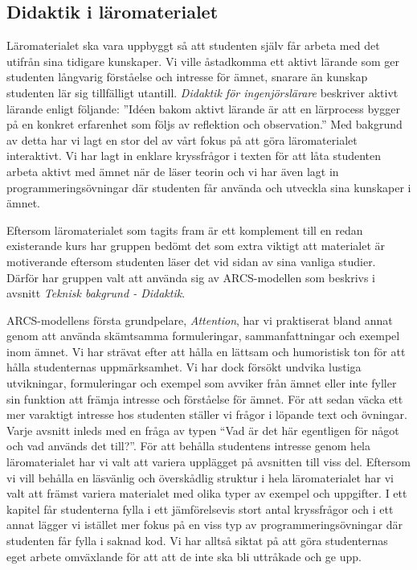 \documentclass[12pt,a4paper,twoside,openright]{article}
\begin{document}
\subsection{Didaktik i läromaterialet}
\label{sec:matDidaktik}
Läromaterialet ska vara uppbyggt så att studenten själv får arbeta med
det utifrån sina tidigare kunskaper. Vi ville åstadkomma ett aktivt
lärande som ger studenten långvarig förståelse och intresse för ämnet,
snarare än kunskap studenten lär sig tillfälligt
utantill. \textit{Didaktik för ingenjörslärare}\cite{didaktik_for_ingenjorslarare} beskriver aktivt
lärande enligt följande: ”Idéen bakom aktivt lärande är att en
lärprocess bygger på en konkret erfarenhet som följs av reflektion och
observation.” Med bakgrund av detta har vi lagt en stor del av vårt
fokus på att göra läromaterialet interaktivt. Vi har lagt in enklare
kryssfrågor i texten för att låta studenten arbeta aktivt med ämnet
när de läser teorin och vi har även lagt in programmeringsövningar där
studenten får använda och utveckla sina kunskaper i ämnet.

Eftersom läromaterialet som tagits fram är ett komplement till en
redan existerande kurs har gruppen bedömt det som extra viktigt att
materialet är motiverande eftersom studenten läser det vid sidan av
sina vanliga studier. Därför har gruppen valt att använda sig av
ARCS-modellen som beskrivs i avsnitt \textit{Teknisk bakgrund -
 Didaktik}.

ARCS-modellens första grundpelare, \textit{Attention}, har vi
praktiserat bland annat genom att använda skämtsamma formuleringar,
sammanfattningar och exempel inom ämnet. Vi har strävat efter att
hålla en lättsam och humoristisk ton för att hålla studenternas
uppmärksamhet. Vi har dock försökt undvika lustiga utvikningar,
formuleringar och exempel som avviker från ämnet eller inte fyller sin
funktion att främja intresse och förståelse för ämnet. För att sedan
väcka ett mer varaktigt intresse hos studenten ställer vi frågor i
löpande text och övningar. Varje avsnitt inleds med en fråga av typen
“Vad är det här egentligen för något och vad används det till?”. För
att behålla studentens intresse genom hela läromaterialet har vi valt
att variera upplägget på avsnitten till viss del. Eftersom vi vill
behålla en läsvänlig och överskådlig struktur i hela läromaterialet
har vi valt att främst variera materialet med olika typer av exempel
och uppgifter. I ett kapitel får studenterna fylla i ett jämförelsevis
stort antal kryssfrågor och i ett annat lägger vi istället mer fokus på en
viss typ av programmeringsövningar där studenten får fylla i saknad
kod. Vi har alltså siktat på att göra studenternas eget arbete
omväxlande för att att de inte ska bli uttråkade och ge upp.
\end{document}
